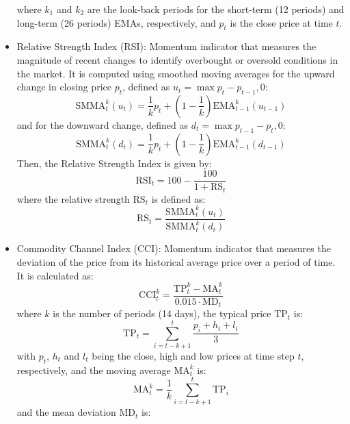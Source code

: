 \begin{itemize}
    where $k_1$ and $k_2$ are the look-back periods for the short-term (12 periods) and long-term (26 periods) EMAs, respectively, and $p_t$ is the close price at time $t$.
    \item Relative Strength Index (RSI): Momentum indicator that measures the magnitude of recent changes to identify overbought or oversold conditions in the market. It is computed using smoothed moving averages for the upward change in closing price $p_t$, defined as $u_t = \max {p_t - p_{t-1}, 0}$: 
    \begin{equation}
        \text{SMMA}_t^k (u_t) = \frac{1}{k}p_t + \left(1 - \frac{1}{k}\right)\text{EMA}_{t-1}^k (u_{t-1})
    \end{equation}
    and for the downward change, defined as $d_t = \max {p_{t-1} - p_t, 0}$:
    \begin{equation}
        \text{SMMA}_t^k (d_t) = \frac{1}{k}p_t + \left(1 - \frac{1}{k}\right)\text{EMA}_{t-1}^k (d_{t-1})
    \end{equation}
    Then, the Relative Strength Index is given by:
    \begin{equation}
        \text{RSI}_t = 100 - \frac{100}{1 + \text{RS}_t}
    \end{equation}
    where the relative strength $\text{RS}_t$ is defined as:
    \begin{equation}
        \text{RS}_t = \frac{\text{SMMA}_t^k (u_t)}{\text{SMMA}_t^k (d_t)}
    \end{equation}
    \item Commodity Channel Index (CCI): Momentum indicator that measures the deviation of the price from its historical average price over a period of time. It is calculated as:
    \begin{equation}
        \text{CCI}_t^k = \frac{\text{TP}_t^k - \text{MA}_t^k}{0.015 \cdot \text{MD}_t}
    \end{equation}
    where $k$ is the number of periods (14 days), the typical price $\text{TP}_t$ is:
    \begin{equation}
        \text{TP}_t = \sum_{i=t-k+1}^{t} \frac{p_{i} + h_{i} + l_{i}}{3}
    \end{equation}
    with $p_t$, $h_t$ and $l_t$ being the close, high and low prices at time step $t$, respectively, and the moving average $\text{MA}_t^k$ is:
    \begin{equation}
        \text{MA}_t^k = \frac{1}{k} \sum_{i=t-k+1}^{t} \text{TP}_i
    \end{equation}
    and the mean deviation $\text{MD}_t$ is:

\end{itemize}
